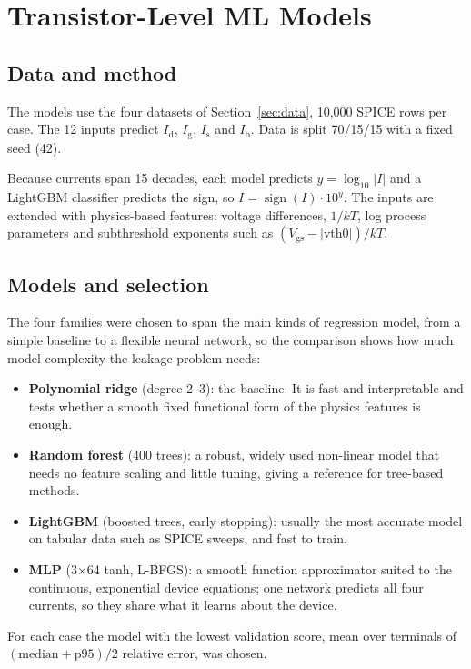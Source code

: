 \documentclass[11pt]{article}
\begin{document}
\section{Transistor-Level ML Models}
\label{sec:models}

\subsection{Data and method}
The models use the four datasets of Section~\ref{sec:data}, 10{,}000 SPICE
rows per case. The 12 inputs predict $I_\mathrm{d}$,
$I_\mathrm{g}$, $I_\mathrm{s}$ and $I_\mathrm{b}$. Data is split 70/15/15
with a fixed seed (42).

Because currents span 15 decades, each model predicts $y=\log_{10}|I|$ and a
LightGBM classifier predicts the sign, so $I=\operatorname{sign}(I)\cdot10^{y}$.
The inputs are extended with physics-based features: voltage differences,
$1/kT$, log process parameters and subthreshold exponents such as
$(V_\mathrm{gs}-|\mathrm{vth0}|)/kT$.

\subsection{Models and selection}
The four families were chosen to span the main kinds of regression model,
from a simple baseline to a flexible neural network, so the comparison shows
how much model complexity the leakage problem needs:
\begin{itemize}
  \item \textbf{Polynomial ridge} (degree 2--3): the baseline. It is fast and
        interpretable and tests whether a smooth fixed functional form of the
        physics features is enough.
  \item \textbf{Random forest} (400 trees): a robust, widely used non-linear
        model that needs no feature scaling and little tuning, giving a
        reference for tree-based methods.
  \item \textbf{LightGBM} (boosted trees, early stopping): usually the most
        accurate model on tabular data such as SPICE sweeps, and fast to train.
  \item \textbf{MLP} (3$\times$64 tanh, L-BFGS): a smooth function
        approximator suited to the continuous, exponential device equations;
        one network predicts all four currents, so they share what it learns
        about the device.
\end{itemize}
For each case the model with the lowest validation score, mean over
terminals of $(\text{median}+\text{p95})/2$ relative error, was chosen.
\end{document}
